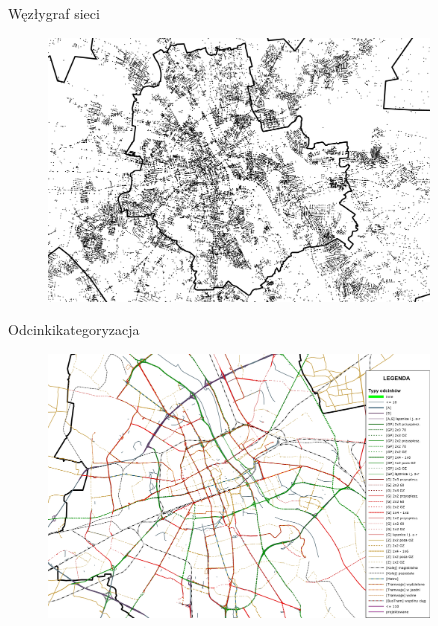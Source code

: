 \documentclass[8pt]{beamer}
\begin{document}
\begin{frame}{Węzły}{graf sieci}
\begin{figure}
\begin{center}
\includegraphics[width=0.9\textwidth]{nodes}
 \end{center}
  \end{figure} 
\end{frame}

\begin{frame}{Odcinki}{kategoryzacja}
\begin{figure}
\begin{center}
\includegraphics[width=0.9\textwidth]{links}
 \end{center}
  \end{figure} 
\end{frame}
\end{document}
